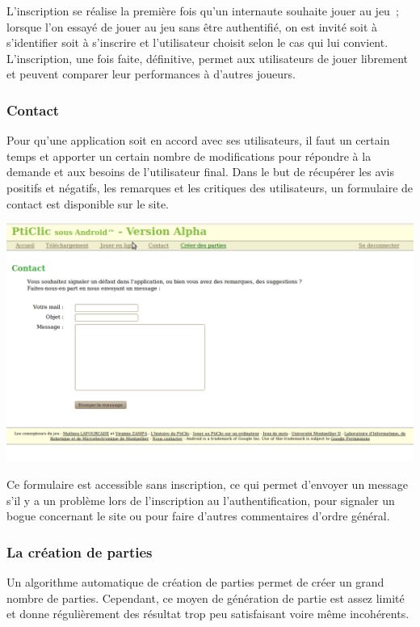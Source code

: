 \documentclass[a4paper,11pt,french]{article}
\begin{document}
L'inscription se réalise la première fois qu'un internaute souhaite jouer au jeu~; lorsque l'on essayé de jouer au jeu sans être authentifié, on est invité soit à s'identifier soit à s'inscrire et l'utilisateur choisit selon le cas qui lui convient. L'inscription, une fois faite, définitive, permet aux utilisateurs de jouer librement et peuvent comparer leur performances à d'autres joueurs.

\subsubsection{Contact}
Pour qu'une application soit en accord avec ses utilisateurs, il faut un certain temps et apporter un certain nombre
de modifications pour répondre à la demande et aux besoins de l'utilisateur final. Dans le but de récupérer les avis positifs et négatifs, les remarques et les critiques des utilisateurs, un formulaire de contact est disponible sur le site. 

\begin{center}
\includegraphics[width=14cm]{img/siteContact.png}
\end{center}

Ce formulaire est accessible sans inscription, ce qui permet d'envoyer un message s'il y a un problème lors de l'inscription au l'authentification, pour signaler un bogue concernant le site ou pour faire d'autres commentaires d'ordre général.

\subsubsection{La création de parties}
Un algorithme automatique de création de parties permet de créer un grand nombre de parties. Cependant, ce moyen
de génération de partie est assez limité et donne régulièrement des résultat trop peu satisfaisant voire même incohérents.
\end{document}
